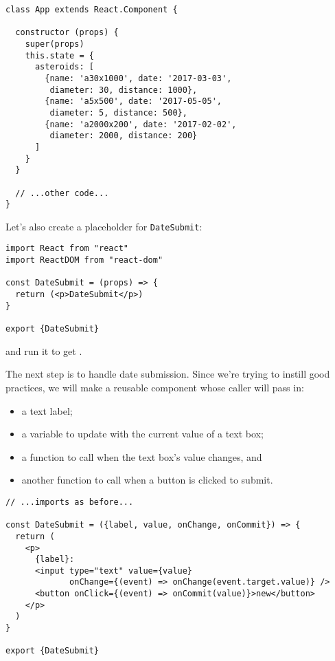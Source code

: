 \begin{verbatim}
class App extends React.Component {

  constructor (props) {
    super(props)
    this.state = {
      asteroids: [
        {name: 'a30x1000', date: '2017-03-03',
         diameter: 30, distance: 1000},
        {name: 'a5x500', date: '2017-05-05',
         diameter: 5, distance: 500},
        {name: 'a2000x200', date: '2017-02-02',
         diameter: 2000, distance: 200}
      ]
    }
  }

  // ...other code...
}
\end{verbatim}

\noindent
Let's also create a placeholder for \texttt{DateSubmit}:

\begin{verbatim}
import React from "react"
import ReactDOM from "react-dom"

const DateSubmit = (props) => {
  return (<p>DateSubmit</p>)
}

export {DateSubmit}
\end{verbatim}

\noindent
and run it to get .


The next step is to handle date submission.
Since we're trying to instill good practices,
we will make a reusable component whose caller will pass in:

\begin{itemize}
\item
  a text label;
\item
  a variable to update with the current value of a text box;
\item
  a function to call when the text box's value changes, and
\item
  another function to call when a button is clicked to submit.
\end{itemize}

\begin{verbatim}
// ...imports as before...

const DateSubmit = ({label, value, onChange, onCommit}) => {
  return (
    <p>
      {label}:
      <input type="text" value={value}
             onChange={(event) => onChange(event.target.value)} />
      <button onClick={(event) => onCommit(value)}>new</button>
    </p>
  )
}

export {DateSubmit}
\end{verbatim}

